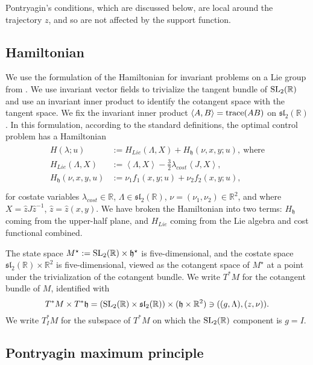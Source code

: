 \documentclass{article}
\theoremstyle{remark}
\newcommand{\ring}[1]{\mathbb{#1}}
\newcommand{\op}[1]{\hbox{#1}}
\newcommand{\ang}[1]{\left\langle{#1}\right\rangle}
\def\sl{\mathfrak{sl}_2(\ring{R})}
\def\SL{\op{SL}_2(\ring{R})}
\def\h{\mathfrak h}
\def\hstar{{\mathfrak h}^\star}
\def\Mstar{M^\star}
\def\Hlie{H_{Lie}}
\begin{document}
Pontryagin's conditions, which are discussed below, are
local around the trajectory $z$, and so are not affected by the
support function.





\subsection{Hamiltonian}\label{sec:ham}


We use the formulation of the Hamiltonian for invariant problems on a
Lie group from \cite[Ch.18]{agrachev2013control}.  We
use invariant vector fields to trivialize the tangent bundle of $\SL$
and use an invariant inner product to identify the cotangent space
with the tangent space.  We fix the invariant inner product $\ang{A,B}
= \op{trace}(AB)$ on $\sl$.  In this formulation, according to the standard
definitions,  the optimal control
problem has a Hamiltonian
\begin{align}\label{eqn:ham}
\begin{split}
H(\lambda;u)&:=
\Hlie(\Lambda,X) + H_{\h}(\nu,x,y;u), 
~\text{where}\\
\Hlie(\Lambda,X) &:= 
\ang{\Lambda,X} - \frac{3}{2} \lambda_{cost} \ang{J,X},\\
H_{\h}(\nu,x,y,u)&:= 
\nu_1 f_1(x,y;u) + \nu_2 f_2(x,y;u),\\
\end{split}
\end{align}
 for
costate variables $\lambda_{cost}\in\ring{R}$, $\Lambda\in \sl$, 
$\nu=(\nu_1,\nu_2)\in\ring{R}^2$,
and where $X = \hat z J \hat z^{-1}$, $\hat z = \hat z(x,y)$.  We
have broken the Hamiltonian into two terms: $H_{\h}$ coming from the
upper-half plane, and $\Hlie$ coming from the Lie algebra and cost
functional combined.

The state space $\Mstar:=\SL\times \hstar$ is five-dimensional, and
  the costate space $\sl\times\ring{R}^2$ is five-dimensional,
viewed as the
cotangent space of $\Mstar$ at a point under the trivialization of the
cotangent bundle.  We write $T^*M$ for the cotangent bundle of $M$,
identified with
\[
T^*M\times T^*\h = (\SL\times\sl)\times (\h\times\ring{R}^2)
\ni((g,\Lambda),(z,\nu)).
\]
We write $T_I^*M$ for the subspace of $T^*M$ on which the $\SL$
component is $g=I$.

\subsection{Pontryagin maximum principle}\label{sec:pmp}
\end{document}
